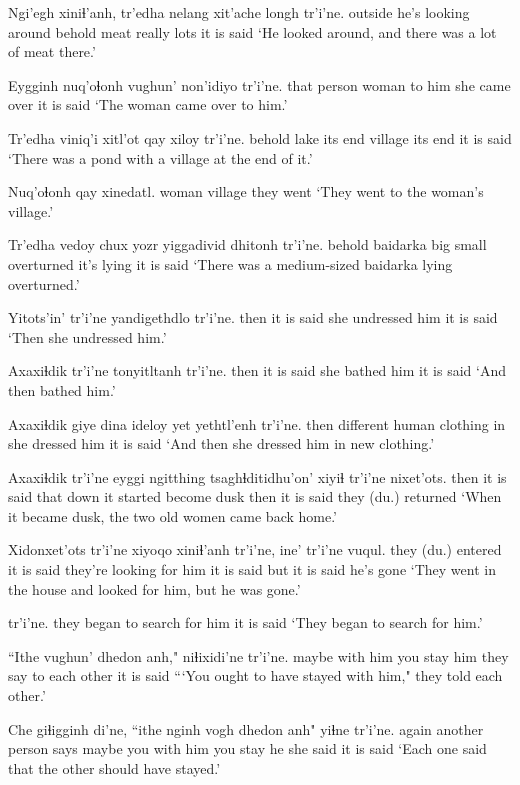 \documentclass[12pt]{article}
\begin{document}
\gll Ngi'egh xiniɬ'anh, tr'edha nelang xit'ache longh tr'i'ne.
outside  {he's looking around} behold  meat  really lots {it is said}
\glt `He looked around, and there was a lot of meat there.'
\glend

\gll Eygginh nuq'oɬonh vughun' non'idiyo tr'i'ne.
{that person} woman  {to him} {she came over} {it is said}
\glt `The woman came over to him.'
\glend

\gll Tr'edha viniq'i xitl'ot qay xiloy tr'i'ne.
behold   lake  {its end} village {its end} {it is said} 
\glt `There was a pond with a village at the end of it.'
\glend

\gll Nuq'oɬonh qay xinedatl.
woman  village {they went}
\glt `They went to the woman's village.'
\glend

\gll Tr'edha vedoy  chux yozr yiggadivid dhitonh tr'i'ne.
behold  baidarka big small overturned {it's lying} {it is said}
\glt `There was a medium-sized baidarka lying overturned.'
\glend

\gll Yitots'in' tr'i'ne yandigethdlo  tr'i'ne.
then  {it is said} {she undressed him} {it is said}
\glt `Then she undressed him.'
\glend

\gll Axaxiɬdik tr'i'ne tonyitltanh  tr'i'ne.
then  {it is said} {she bathed him} {it is said}
\glt `And then bathed him.'
\glend

\gll Axaxiɬdik giye  dina ideloy yet yethtl'enh  tr'i'ne.
then  different human clothing in {she dressed him} {it is said}
\glt `And then she dressed him in new clothing.'
\glend

\gll Axaxiɬdik tr'i'ne eyggi ngitthing tsaghɬditidhu'on' xiyiɬ tr'i'ne nixet'ots.
then  {it is said} that down {it started become dusk} then {it is said} {they (du.) returned}
\glt `When it became dusk, the two old women came back home.'
\glend

\gll Xidonxet'ots tr'i'ne {xiyoqo xiniɬ'anh} tr'i'ne, ine' tr'i'ne vuqul.
{they (du.) entered} {it is said} {they're looking for him} {it is said} but {it is said} {he's gone}
\glt `They went in the house and looked for him, but he was gone.'
\glend

 tr'i'ne.
{they began to search for him} {it is said}
\glt `They began to search for him.'
\glend

\gll ``Ithe vughun' dhedon anh," niɬixidi'ne   tr'i'ne.
maybe {with him} {you stay} him {they say to each other}  {it is said}
\glt ```You ought to have stayed with him," they told each other.'
\glend

\gll Che giɬigginh di'ne, ``ithe nginh  vogh  dhedon anh"  yiɬne  tr'i'ne.
again {another person} says maybe you  {with him} {you stay} he {she said} {it is said}
\glt `Each one said that the other should have stayed.'
\glend
\end{document}

